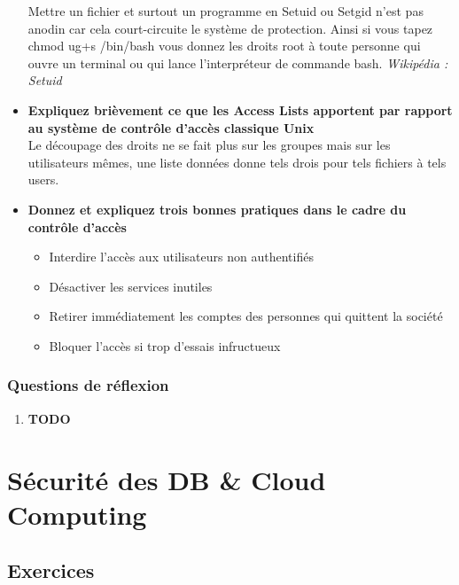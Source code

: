 \documentclass{report}
\begin{document}
\begin{itemize}
					Mettre un fichier et surtout un programme en Setuid ou Setgid n'est pas anodin car cela court-circuite le système de protection. Ainsi si vous tapez chmod ug+s /bin/bash vous donnez les droits root à toute personne qui ouvre un terminal ou qui lance l'interpréteur de commande bash. \textit{Wikipédia : Setuid}

				\item \textbf{Expliquez brièvement ce que les Access Lists apportent par rapport au système de contrôle d'accès classique Unix}\\

					Le découpage des droits ne se fait plus sur les groupes mais sur les utilisateurs mêmes, une liste données donne tels drois pour tels fichiers à tels users.\\

				\item \textbf{Donnez et expliquez trois bonnes pratiques dans le cadre du contrôle d'accès}	\\

					\begin{itemize}
						\item Interdire l'accès aux utilisateurs non authentifiés
						\item Désactiver les services inutiles
						\item Retirer immédiatement les comptes des personnes qui quittent la société
						\item Bloquer l'accès si trop d'essais infructueux
					\end{itemize}
			\end{itemize}
				

		\subsection{Questions de réflexion}

			\begin{enumerate}
				\item \textbf{TODO}
			\end{enumerate}

\chapter{Sécurité des DB \& Cloud Computing}
	
	\section{Exercices}
\end{document}
